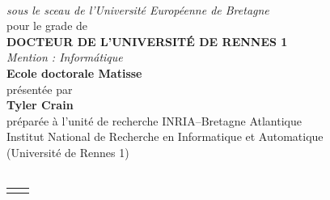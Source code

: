 \begin{titlepage}
\begin{center}
\begin{minipage}{\glarg}
\vspace{-0.5cm}
\\ \vspace{0mm}\emph{\Large sous le sceau de l'Universit\'e Europ\'eenne de Bretagne}\\ \vspace{0.5cm}
{\Large pour le grade de}\\ \vspace{2mm}
{\Large\bf DOCTEUR DE L'UNIVERSIT\'E DE RENNES 1}\\ \vspace{0.4cm}
\emph{\Large Mention : Inform{\'a}tique}\\ \vspace{2mm}
{\Large\bf Ecole doctorale Matisse}\\ \vspace{0.3cm}
{\Large pr\'esent\'ee par} \\ \vspace{3mm}
{\Huge\bf Tyler Crain}\\ \vspace{0.4cm}
{\Large pr\'epar\'ee \`a l'unit\'e de recherche INRIA--Bretagne Atlantique\\
Institut National de Recherche en Informatique et Automatique \\
(Universit\'{e} de Rennes 1)}\vspace{0.3cm}
\\
\hspace{-20mm}{\rule{\Glarg}{1pt}}\\
\vspace{8mm}

\begin{tabular}{p{7cm}p{10cm}}
\begin{minipage}{\plarg}
\vspace{-4cm}

\hspace{-1.8cm}{\huge\bf On Improving the}\vspace{5mm}

\hspace{-1.8cm}{\huge\bf  Ease of Use of the}\vspace{5mm}


\end{minipage}
\end{tabular}
\end{minipage}
\end{center}
\end{titlepage}
